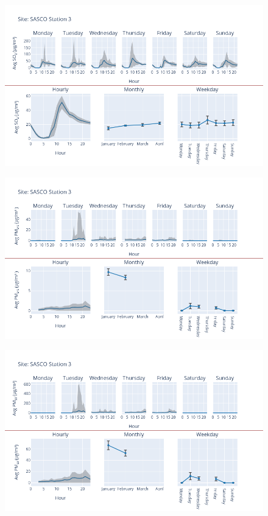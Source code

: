 \documentclass[12pt, oneside]{book}
\begin{document}
{ 
{\begin{figure}[H] 
 \centering 
\includegraphics[width=.88\textwidth, keepaspectratio]{image149} 
 \end{figure}}{} 

{\begin{figure}[H] 
 \centering 
\includegraphics[width=.88\textwidth, keepaspectratio]{image150} 
 \end{figure}}{} 

{\begin{figure}[H] 
 \centering 
\includegraphics[width=.88\textwidth, keepaspectratio]{image151} 
 \end{figure}}{} 

}
\end{document}
